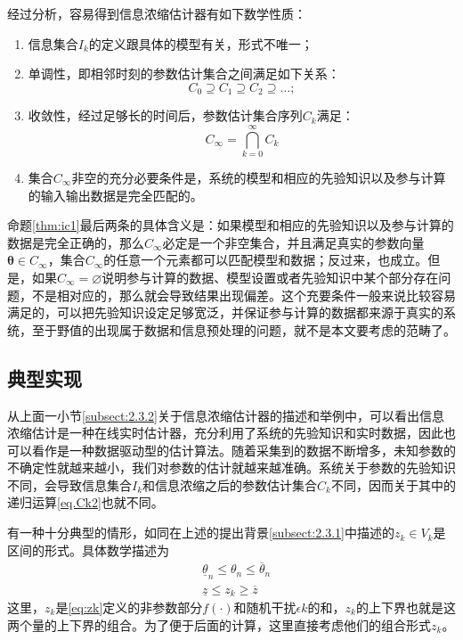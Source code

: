 \begin{prop}%
\label{thm:ic1}
经过分析，容易得到信息浓缩估计器有如下数学性质：
\begin{enumerate}
\item 信息集合$I_{k}$的定义跟具体的模型有关，形式不唯一；
\item 单调性，即相邻时刻的参数估计集合之间满足如下关系：
\begin{equation}%
C_{0}\supseteq C_{1}\supseteq C_{2}\supseteq\ldots;
\end{equation}
\item 收敛性，经过足够长的时间后，参数估计集合序列$C_{k}$满足：
\begin{equation}%
C_{\infty} = \bigcap_{k=0}^{\infty}C_{k}
\end{equation}
\item 集合$C_{\infty}$非空的充分必要条件是，系统的模型和相应的先验知识以及参与计算的输入输出数据是完全匹配的。
\end{enumerate}
\end{prop}

命题\ref{thm:ic1}最后两条的具体含义是：如果模型和相应的先验知识以及参与计算的数据是完全正确的，那么$C_{\infty}$必定是一个非空集合，并且满足真实的参数向量$\bm{\theta}\in C_{\infty}$，集合$C_{\infty}$的任意一个元素都可以匹配模型和数据；反过来，也成立。但是，如果$C_{\infty}=\varnothing$说明参与计算的数据、模型设置或者先验知识中某个部分存在问题，不是相对应的，那么就会导致结果出现偏差。这个充要条件一般来说比较容易满足的，可以把先验知识设定足够宽泛，并保证参与计算的数据都来源于真实的系统，至于野值的出现属于数据和信息预处理的问题，就不是本文要考虑的范畴了。
\subsection{典型实现}\label{subsect:2.3.3}
从上面一小节\ref{subsect:2.3.2}关于信息浓缩估计器的描述和举例中，可以看出信息浓缩估计是一种在线实时估计器，充分利用了系统的先验知识和实时数据，因此也可以看作是一种数据驱动型的估计算法。随着采集到的数据不断增多，未知参数的不确定性就越来越小，我们对参数的估计就越来越准确。系统关于参数的先验知识不同，会导致信息集合$I_{k}$和信息浓缩之后的参数估计集合$C_{k}$不同，因而关于其中的递归运算\eqref{eq.Ck2}也就不同。

有一种十分典型的情形，如同在上述的提出背景\ref{subsect:2.3.1}中描述的$z_{k}\in V_{k}$是区间的形式。具体数学描述为
\begin{eqnarray}%
&\underline{\theta}_{n}\leq\theta_{n}\leq\overline{\theta}_{n}\\
&\underline{z}\leq z_{k}\geq\overline{z}
\end{eqnarray}
这里，$z_{k}$是\eqref{eq:zk}定义的非参数部分$f(\cdot)$和随机干扰$\epsilon{k}$的和，$z_{k}$的上下界也就是这两个量的上下界的组合。为了便于后面的计算，这里直接考虑他们的组合形式$z_{k}$。

